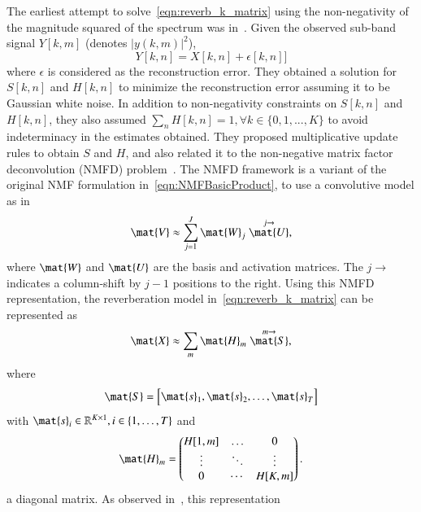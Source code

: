 The earliest attempt to solve~\eqref{eqn:reverb_k_matrix} using the
non-negativity of the magnitude squared of the spectrum was
in~\cite{kameoka2009robust}. Given the observed sub-band signal $Y[k,m]$
(denotes $|y(k,m)|^2$),
\begin{equation}
  Y[k,n] = X[k,n] + \epsilon[k,n]]
  \label{eqn:robust_cost}
\end{equation}
where $\epsilon$ is considered as the reconstruction error. They obtained a
solution for $S[k,n]$ and $H[k,n]$ to minimize the reconstruction error
assuming it to be Gaussian white noise. In addition to non-negativity
constraints on $S[k,n]$ and $H[k,n]$, they also assumed $\sum_n H[k,n] = 1, \forall k \in \{0,1,...,K\}$ to
avoid indeterminacy in the estimates obtained. They proposed multiplicative
update rules to obtain $S$ and $H$, and also related it to the non-negative
matrix factor deconvolution (NMFD) problem~\cite{Smaragdis2004ConvolutiveNMF}.
The NMFD framework is a variant of the original NMF
formulation in~\eqref{eqn:NMFBasicProduct}, to use a convolutive model as in
\begin{equation}
  \mat{V} \approx \sum_{j=1}^J \mat{W}_j \stackrel{j\rightarrow}{\mat{U}},
  \label{eqn:NMFConvolutive}
\end{equation}
where $\mat{W}$ and $\mat{U}$ are the basis and activation matrices. The
$j\rightarrow$ indicates a column-shift by $j-1$ positions to the right. Using this
NMFD representation, the reverberation model in~\eqref{eqn:reverb_k_matrix} can be represented as
\begin{equation}
  \mat{X} \approx \sum_{m} \mat{H}_m \stackrel{m\rightarrow}{\mat{S}},
  \label{eqn:reverbNMFD}
\end{equation}
where 
\begin{equation}
  \mat{S} = \begin{bmatrix} \mat{s}_1, \mat{s}_2, \ldots, \mat{s}_T
  \end{bmatrix}
  \label{eqn:nmfd_s}
\end{equation}
with $\mat{s}_i \in \mathbb{R}^{K \times 1}, i\in \{1, \ldots, T\}$ and 
\begin{equation}
  \mat{H}_m = \begin{pmatrix} H[1,m] & \ldots & 0 \\ \vdots & \ddots & \vdots \\
    0 & \cdots & H[K,m] \end{pmatrix}.
\end{equation}
a diagonal matrix. As observed in~\cite{kameoka2009robust}, this representation
